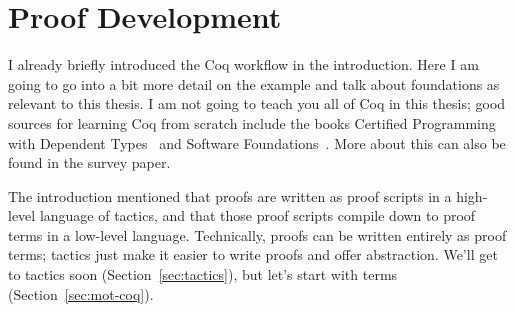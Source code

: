 \section{Proof Development}
\label{sec:mot-dev}


I already briefly introduced the Coq workflow in the introduction.
Here I am going to go into a bit more detail on the example and talk about foundations as relevant to this thesis.
I am not going to teach you all of Coq in this thesis;
good sources for learning Coq from scratch include the books Certified Programming with Dependent Types~\cite{chlipala:cpdt}
and Software Foundations~\cite{software-foundations}.
More about this can also be found in the survey paper.

The introduction mentioned that proofs are written as proof scripts in a high-level language of tactics,
and that those proof scripts compile down to proof terms in a low-level language.
Technically, proofs can be written entirely as proof terms; tactics just make it easier to write proofs and offer abstraction.
We'll get to tactics soon (Section~\ref{sec:tactics}), but let's start with terms (Section~\ref{sec:mot-coq}).





